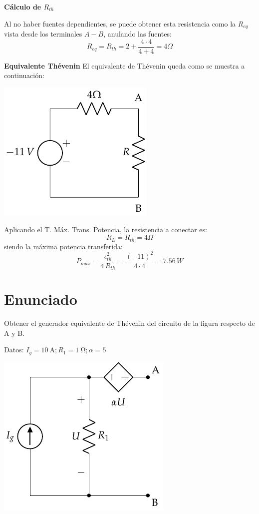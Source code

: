 \textbf{Cálculo de $R_{th}$}

Al no haber fuentes dependientes, se puede obtener esta resistencia
como la $R_{eq}$ vista desde los terminales $A-B$, anulando las
fuentes:
\begin{equation*}
  R_{eq}=R_{th}=2+\dfrac{4\cdot 4}{4+4}=4\Omega
\end{equation*}

\textbf{Equivalente Thévenin} El equivalente de Thévenin queda como se
muestra a continuación:

\begin{center}
  \includegraphics{figuras/BT1_17_th.pdf}
\end{center}

Aplicando el T. Máx. Trans. Potencia, la resistencia a conectar es:
\begin{equation*}
  R_L=R_{th}=4\Omega
\end{equation*}
siendo la máxima potencia transferida:
\begin{equation*}
  P_{max}=\dfrac{\epsilon_{th}^2}{4\,R_{th}}=\dfrac{(-11)^2}{4\cdot 4}=7.56\,W
\end{equation*}


\section{Enunciado}
Obtener el generador equivalente de Thévenin del circuito de la figura respecto de A y B.

Datos: $I_g=\qty{10}{\ampere}; R_1=\qty{1}{\ohm}; \alpha=5$
\begin{center}
  \includegraphics{figuras/Thevenin1.pdf}
\end{center}

